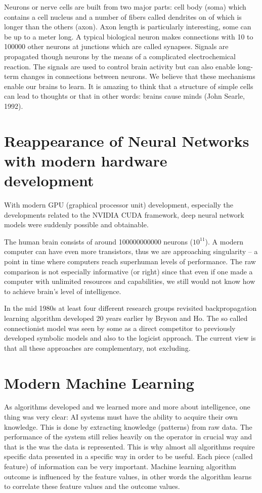 \documentclass[b5paper]{book}
\let\cite\parencite
\begin{document}
Neurons or nerve cells are built from two major parts: cell body (soma) which contains a cell nucleus and a number of fibers called dendrites on of which is longer than the others (axon). Axon length is particularly interesting, some can be up to a meter long. A typical biological neuron makes connections with 10 to 100000 other neurons at junctions which are called synapses. Signals are propagated though neurons by the means of a complicated electrochemical reaction. The signals are used to control brain activity but can also enable long-term changes in connections between neurons. We believe that these mechanisms enable our brains to learn. It is amazing to think that a structure of simple cells can lead to thoughts or that in other words: brains cause minds (John Searle, 1992). \cite{searle1992rediscovery}

\section{Reappearance of Neural Networks with modern hardware development}

With modern GPU (graphical processor unit) development, especially the developments related to the NVIDIA CUDA framework, deep neural network models were suddenly possible and obtainable.

The human brain consists of around 100000000000 neurons (\(10^{11} \)). A modern computer can have even more transistors, thus we are approaching singularity -- a point in time where computers reach superhuman levels of performance. The raw comparison is not especially informative (or right) since that even if one made a computer with unlimited resources and capabilities, we still would not know how to achieve brain's level of intelligence.

In the mid 1980s at least four different research groups revisited backpropagation learning algorithm developed 20 years earlier by Bryson and Ho. \cite{lecun1988theoretical} The so called connectionist model was seen by some as a direct competitor to previously developed symbolic models and also to the logicist approach. The current view is that all these approaches are complementary, not excluding.

\section{Modern Machine Learning}

As algorithms developed and we learned more and more about intelligence, one thing was very clear: AI systems must have the ability to acquire their own knowledge. This is done by extracting knowledge (patterns) from raw data. The performance of the system still relies heavily on the operator in crucial way and that is the was the data is represented. This is why almost all algorithms require specific data presented in a specific way in order to be useful. Each piece (called feature) of information can be very important. Machine learning algorithm outcome is influenced by the feature values, in other words the algorithm learns to correlate these feature values and the outcome values.
\end{document}
